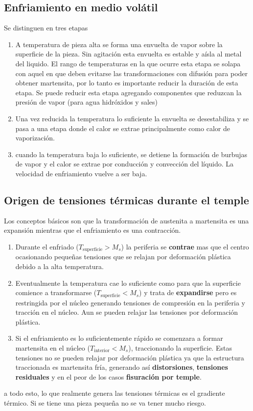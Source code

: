 \subsection{Enfriamiento en medio volátil}\label{ssec:enfriamientoEnMedio}
Se distinguen en tres etapas
\begin{enumerate}[label=(\Alph*)] \label{enum:etapasTemple}
    \item A temperatura de pieza alta se forma una envuelta de vapor sobre la superficie de la pieza. Sin agitación esta envuelta es estable y aísla al metal del liquido. El rango de temperaturas en la que ocurre esta etapa se solapa con aquel en que deben evitarse las transformaciones con difusión para poder obtener martensita, por lo tanto es importante reducir la duración de esta etapa. Se puede reducir esta etapa agregando componentes que reduzcan la presión de vapor (para agua hidróxidos y sales)\label{item:etapaAEnfriamiento}
    \item Una vez reducida la temperatura lo suficiente la envuelta se desestabiliza y se pasa a una etapa donde el calor se extrae principalmente como calor de vaporización. \label{item:etapaBEnfriamiento}
    \item cuando la temperatura baja lo suficiente, se detiene la formación de burbujas de vapor y el calor se extrae por conducción y convección del líquido. La velocidad de enfriamiento vuelve a ser baja. \label{item:etapaCEnfriamiento}
\end{enumerate}



\subsection{Origen de tensiones térmicas durante el temple}
Los conceptos básicos son que la transformación de austenita a martensita es una expansión mientras que el enfriamiento es una contracción. 
\begin{enumerate}
    \item Durante el enfriado ($T_{\mathrm{superficie}}>M_s$) la periferia se \textbf{contrae} mas que el centro ocasionando pequeñas tensiones que se relajan por deformación plástica debido a la alta temperatura. 
    \item Eventualmente la temperatura cae lo suficiente como para que la superficie comience a transformarse ($T_{\mathrm{superficie}}<M_s$) y trata de \textbf{expandirse} pero es restringida por el núcleo generando tensiones de compresión en la periferia y tracción en el núcleo. Aun se pueden relajar las tensiones por deformación plástica.
    \item Si el enfriamiento es lo suficientemente rápido se comenzara a formar martensita en el núcleo ($T_{\mathrm{interior}}<M_s$), traccionando la superficie. Estas tensiones no se pueden relajar por deformación plástica ya que la estructura traccionada es martensita fría, generando así \textbf{distorsiones}, \textbf{tensiones residuales} y en el peor de los casos \textbf{fisuración por temple}.
\end{enumerate}
a todo esto, lo que realmente genera las tensiones térmicas es el gradiente térmico. Si se tiene una pieza pequeña no se va tener mucho riesgo.

